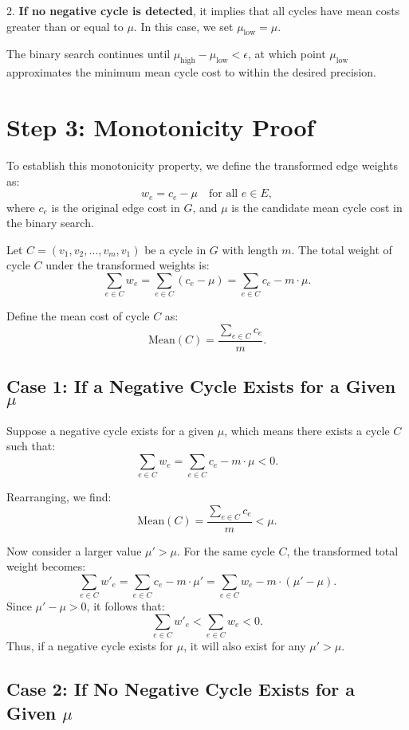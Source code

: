 2. \textbf{If no negative cycle is detected}, it implies that all cycles have mean costs greater than or equal to \( \mu \). In this case, we set \( \mu_{\text{low}} = \mu \).

The binary search continues until \( \mu_{\text{high}} - \mu_{\text{low}} < \epsilon \), at which point \( \mu_{\text{low}} \) approximates the minimum mean cycle cost to within the desired precision.

\section*{Step 3: Monotonicity Proof}

To establish this monotonicity property, we define the transformed edge weights as:
\[
w_e = c_e - \mu \quad \text{for all } e \in E,
\]
where \( c_e \) is the original edge cost in \( G \), and \(\mu\) is the candidate mean cycle cost in the binary search.

Let \( C = (v_1, v_2, \dots, v_m, v_1) \) be a cycle in \( G \) with length \( m \). The total weight of cycle \( C \) under the transformed weights is:
\[
\sum_{e \in C} w_e = \sum_{e \in C} (c_e - \mu) = \sum_{e \in C} c_e - m \cdot \mu.
\]

Define the mean cost of cycle \( C \) as:
\[
\text{Mean}(C) = \frac{\sum_{e \in C} c_e}{m}.
\]

\subsection*{Case 1: If a Negative Cycle Exists for a Given \(\mu\)}

Suppose a negative cycle exists for a given \(\mu\), which means there exists a cycle \( C \) such that:
\[
\sum_{e \in C} w_e = \sum_{e \in C} c_e - m \cdot \mu < 0.
\]

Rearranging, we find:
\[
\text{Mean}(C) = \frac{\sum_{e \in C} c_e}{m} < \mu.
\]

Now consider a larger value \(\mu' > \mu\). For the same cycle \( C \), the transformed total weight becomes:
\[
\sum_{e \in C} w'_e = \sum_{e \in C} c_e - m \cdot \mu' = \sum_{e \in C} w_e - m \cdot (\mu' - \mu).
\]
Since \(\mu' - \mu > 0\), it follows that:
\[
\sum_{e \in C} w'_e < \sum_{e \in C} w_e < 0.
\]
Thus, if a negative cycle exists for \(\mu\), it will also exist for any \(\mu' > \mu\).

\subsection*{Case 2: If No Negative Cycle Exists for a Given \(\mu\)}

